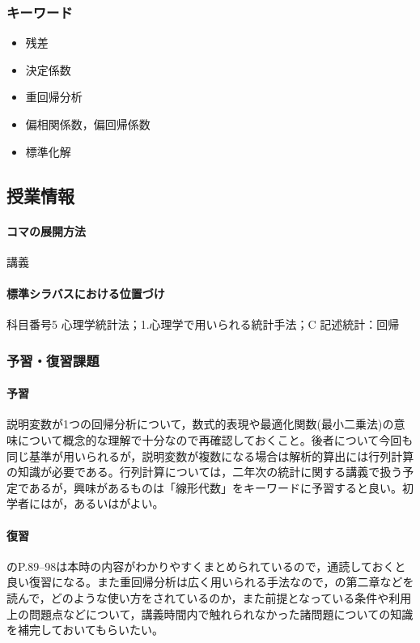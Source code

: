 \subsubsection{キーワード}
\begin{itemize}
	\item 残差
	\item 決定係数
	\item 重回帰分析
	\item 偏相関係数，偏回帰係数
	\item 標準化解
\end{itemize}
\subsection{授業情報}
\paragraph{コマの展開方法}
講義
\paragraph{標準シラバスにおける位置づけ}
科目番号5 心理学統計法；1.心理学で用いられる統計手法；C 記述統計：回帰
\subsubsection{予習・復習課題}
\paragraph{予習}
説明変数が1つの回帰分析について，数式的表現や最適化関数(最小二乗法)の意味について概念的な理解で十分なので再確認しておくこと。後者について今回も同じ基準が用いられるが，説明変数が複数になる場合は解析的算出には行列計算の知識が必要である。行列計算については，二年次の統計に関する講義で扱う予定であるが，興味があるものは「線形代数」をキーワードに予習すると良い。初学者には\citet{Yuki201810}が，あるいは\citet{Okada200804}がよい。
\paragraph{復習}
\citet{Toyoda201706}のP.89--98は本時の内容がわかりやすくまとめられているので，通読しておくと良い復習になる。また重回帰分析は広く用いられる手法なので，\citet{kosugi2016a}の第二章などを読んで，どのような使い方をされているのか，また前提となっている条件や利用上の問題点などについて，講義時間内で触れられなかった諸問題についての知識を補完しておいてもらいたい。
